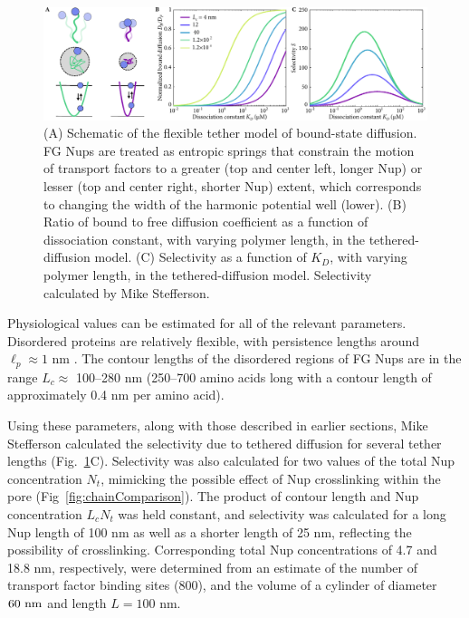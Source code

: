 \begin{figure}
\centering
\includegraphics[width=\textwidth]{figs/ch02/fig3.pdf}
\caption[Selectivity from tethered diffusion.]{(A) Schematic of the flexible tether model of bound-state
  diffusion. FG Nups are treated as entropic springs that constrain
  the motion of transport factors to a greater (top and center left, longer Nup) or lesser
  (top and center right, shorter Nup) extent, which corresponds to changing
  the width of the harmonic potential well (lower).  (B) Ratio of bound to
  free diffusion coefficient as a function of dissociation constant,
  with varying polymer length, in the tethered-diffusion model.  (C)
  Selectivity as a function of $K_D$, with varying polymer length, in
  the tethered-diffusion model.  Selectivity calculated by Mike Stefferson.}
\label{fig:tethers}
\end{figure}

Physiological values can be estimated for all of the relevant parameters.  Disordered proteins are relatively flexible, with persistence lengths around $\ell_p \approx 1$ nm \cite{receveur-brechot12}.  The contour lengths of the disordered regions of FG Nups are in the range $L_c\approx$ 100--280 nm (250--700 amino acids long \cite{patel07} with a contour length of approximately 0.4 nm per amino acid).

Using these parameters, along with those described in earlier sections, Mike Stefferson calculated the selectivity due to tethered diffusion for several tether lengths (Fig.~\ref{fig:tethers}C).  Selectivity was also calculated for two values of the total Nup concentration $N_t$, mimicking the possible effect of Nup crosslinking within the pore (Fig~\ref{fig:chainComparison}).  The product of contour length and Nup concentration $L_cN_t$ was held constant, and selectivity was calculated for a long Nup length of 100 nm as well as a shorter length of 25 nm, reflecting the possibility of crosslinking.  Corresponding total Nup concentrations of 4.7 and 18.8 nm, respectively, were determined from an estimate of the number of transport factor binding sites ($800$), and the volume of a cylinder of diameter $60\ \nm$ and length $L = 100$ nm. 

